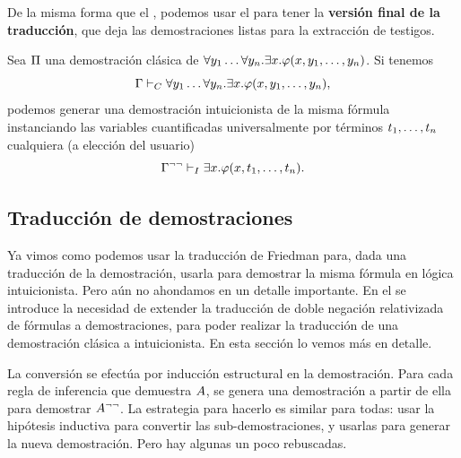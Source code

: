 \begin{corollary}
    \label{fri:cor:forall-inst}
    De la misma forma que el , podemos usar el  para tener la \textbf{versión final de la traducción}, que deja las demostraciones listas para la extracción de testigos.

    Sea $\Pi$ una demostración clásica de \(
    \forall y_1 \dots \forall y_n .
    \exists x .
    \varphi(x, y_1, \dots, y_n)
    \). Si tenemos
    \[
        \Gamma \vdash_C
        \forall y_1 \dots \forall y_n .
        \exists x .
        \varphi(x, y_1, \dots, y_n),
    \]
    podemos generar una demostración intuicionista de la misma fórmula instanciando las variables cuantificadas universalmente por términos $t_1, \dots, t_n$ cualquiera (a elección del usuario)
    \[
        \Gamma^{\neg\neg} \vdash_I
        \exists x .
        \varphi(x, t_1, \dots, t_n).
    \]
\end{corollary}

\subsection{Traducción de demostraciones}
\label{fri:sec:proof-trans}

Ya vimos como podemos usar la traducción de Friedman para, dada una traducción de la demostración, usarla para demostrar la misma fórmula en lógica intuicionista. Pero aún no ahondamos en un detalle importante. En el  se introduce la necesidad de extender la traducción de doble negación relativizada de fórmulas a demostraciones, para poder realizar la traducción de una demostración clásica a intuicionista. En esta sección lo vemos más en detalle.

La conversión se efectúa por inducción estructural en la demostración. Para cada regla de inferencia que demuestra $A$, se genera una demostración a partir de ella para demostrar $A^{\neg\neg}$. La estrategia para hacerlo es similar para todas: usar la hipótesis inductiva para convertir las sub-demostraciones, y usarlas para generar la nueva demostración. Pero hay algunas un poco rebuscadas.

